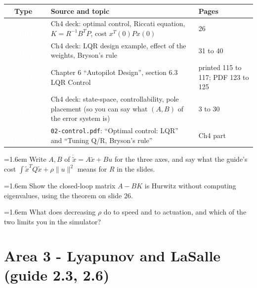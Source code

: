 \documentclass[10pt,a4paper]{article}
\newcommand{\cb}{\raisebox{-0.35ex}{\Large$\square$}}
\newcommand{\srctag}[2]{\colorbox{#1}{\textcolor{white}{\textbf{\scriptsize\,#2\,}}}}
\newcommand{\SLIDES}{\srctag{slides}{SLIDES}}
\newcommand{\BOOK}{\srctag{book}{BOOK}}
\newcommand{\NOTES}{\srctag{notes}{NOTES}}
\newcommand{\chk}[1]{\par\noindent\hangindent=1.6em\hangafter=1 \cb\hspace{0.6em}#1}
\begin{document}
\begin{tabularx}{\textwidth}{@{}C T X l@{}}
\toprule
\cb & Type & Source and topic & Pages\\
\midrule
\cb & \SLIDES & Ch4 deck: optimal control, Riccati equation, $K=R^{-1}B^TP$, cost $x^T(0)Px(0)$ & 26\\
\cb & \SLIDES & Ch4 deck: LQR design example, effect of the weights, Bryson's rule & 31 to 40\\
\cb & \BOOK & Chapter 6 ``Autopilot Design'', section 6.3 LQR Control & printed 115 to 117; PDF 123 to 125\\
\cb & \SLIDES & Ch4 deck: state-space, controllability, pole placement (so you can say what $(A,B)$ of the error system is) & 3 to 30\\
\cb & \NOTES & \texttt{02-control.pdf}: ``Optimal control: LQR'' and ``Tuning Q/R, Bryson's rule'' & Ch4 part\\
\bottomrule
\end{tabularx}
\begin{selfcheck}
\chk{Write $A,B$ of $\dot{\tilde x}=A\tilde x+Bu$ for the three axes, and say what the guide's cost $\int \tilde x^TQ\tilde x+\rho\|u\|^2$ means for $R$ in the slides.}
\chk{Show the closed-loop matrix $A-BK$ is Hurwitz without computing eigenvalues, using the theorem on slide 26.}
\chk{What does decreasing $\rho$ do to speed and to actuation, and which of the two limits you in the simulator?}
\end{selfcheck}

\section*{Area 3 - Lyapunov and LaSalle \hfill\normalfont\small (guide 2.3, 2.6)}
\end{document}
